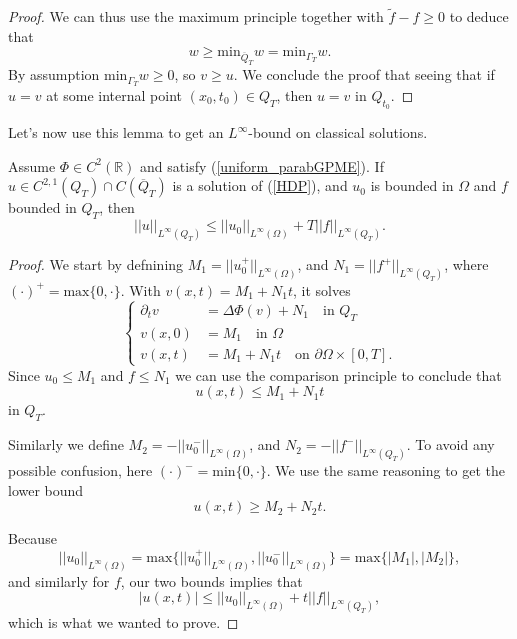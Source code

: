 \documentclass[11pt, a4paper]{article}
\begin{document}
\begin{proof}
We can thus use the maximum principle together with $\tilde{f}-f \geq 0$ to deduce that
\begin{equation*}
w \geq \mathrm{min}_{\overline{Q}_T}w = \mathrm{min}_{\Gamma_T}w.
\end{equation*}
By assumption $\mathrm{min}_{\Gamma_T}w \geq 0$, so $v \geq u$. We conclude the proof that seeing that if $u=v$ at some internal point $(x_0,t_0) \in Q_T$, then $u=v$ in $Q_{t_0}$.
\end{proof}


Let's now use this lemma to get an $L^\infty$-bound on classical solutions.
\begin{lemma}
Assume $\Phi \in C^2(\mathbb{R})$ and satisfy (\ref{uniform_parabGPME}). If $u \in C^{2,1}(Q_T)\cap C(\overline{Q}_T)$ is a solution of (\ref{HDP}), and $u_0$ is bounded in $\Omega$ and $f$ bounded in $Q_T$, then
	\begin{equation}
		\label{infinity_bound}
		||u||_{L^\infty(Q_T)} \leq ||u_0||_{L^\infty(\Omega)} + T||f||_{L^\infty(Q_T)}.
	\end{equation}
\end{lemma}

\begin{proof}
We start by defnining $M_1 = ||u_0^+||_{L^\infty(\Omega)} $, and $N_1 = ||f^+||_{L^\infty(Q_T)}$, where $(\cdot)^+ = \mathrm{max} \{ 0,\cdot \}$. With $v(x,t) = M_1 + N_1t$, it solves
\begin{equation*}
\begin{cases}
	\partial_t v &= \Delta\Phi(v) +N_1 \quad \text{in } Q_T\\
	v(x,0) &= M_1 \quad \text{in } \Omega \\
	v(x,t) &= M_1 + N_1t \quad \text{on } \partial \Omega \times [0,T].
\end{cases}
\end{equation*}
Since $u_0 \leq M_1$ and $f\leq N_1$ we can use the comparison principle to conclude that
\begin{equation*}
u(x,t) \leq M_1 + N_1t
\end{equation*}
in $Q_T$.

Similarly we define $M_2 = -||u_0^-||_{L^\infty(\Omega)}$, and $N_2 = -||f^-||_{L^\infty(Q_T)}$. To avoid any possible confusion, here $(\cdot)^- = \mathrm{min}\{0, \cdot \}$. We use the same reasoning to get the lower bound
\begin{equation*}
u(x,t) \geq M_2 + N_2t.
\end{equation*}

Because
\begin{equation*}
||u_0||_{L^\infty(\Omega)} = \mathrm{max}\{ ||u_0^+||_{L^\infty(\Omega)}, ||u_0^-||_{L^\infty(\Omega)} \} = \mathrm{max}\{|M_1|,|M_2|\},
\end{equation*}
and similarly for $f$, our two bounds implies that
\begin{equation*}
|u(x,t)| \leq ||u_0||_{L^\infty(\Omega)} + t||f||_{L^\infty(Q_T)},
\end{equation*}
which  is what we wanted to prove.

\end{proof}
\end{document}
